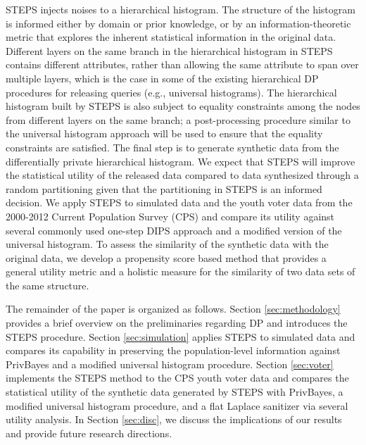 \documentclass[12pt, A4]{article}
\theoremstyle{plain}
\theoremstyle{exampstyle}\newtheorem{defn}{Definition}
\theoremstyle{exampstyle}\newtheorem{lem}{Lemma}
\theoremstyle{exampstyle}\newtheorem{cor}{Corollary}
\theoremstyle{exampstyle}\newtheorem{pro}{Proposition}
\theoremstyle{exampstyle}\newtheorem{cla}{Claim}
\theoremstyle{exampstyle}\newtheorem{rem}{Remark}
\begin{document}
STEPS injects noises to a hierarchical histogram. The structure of the histogram is informed either by domain or prior knowledge, or by an information-theoretic metric that explores the inherent statistical information in the original data. Different layers on the same branch in the hierarchical histogram in STEPS contains different attributes, rather than allowing the same attribute to span over multiple layers, which is the case in some of the existing hierarchical DP procedures for releasing queries (e.g., universal histograms). The hierarchical histogram built by STEPS is also subject to equality constraints among the nodes from different layers on the same branch; a post-processing procedure similar to the universal histogram approach \citep{hay2010boosting} will be used to ensure that the equality constraints are satisfied. The final step is to generate synthetic data from the differentially private hierarchical histogram. We expect that STEPS will improve the statistical utility of the released data compared to data synthesized through a random partitioning given that the partitioning in STEPS is an informed decision. We apply STEPS to simulated data and the youth voter data from the 2000-2012 Current Population Survey (CPS) and compare its utility against several commonly used one-step DIPS approach and a modified version of the universal histogram. To assess the similarity of the synthetic data with the original data, we develop a propensity score based method that provides a general utility metric and a holistic measure for the similarity of two data sets of the same structure. 

The remainder of the paper is organized as follows. Section \ref{sec:methodology} provides a brief overview on the preliminaries regarding DP and introduces the STEPS procedure. Section \ref{sec:simulation} applies STEPS to simulated data and compares its capability in preserving the population-level information against PrivBayes and a modified universal histogram procedure. Section \ref{sec:voter} implements the STEPS method to the CPS youth voter data and compares the statistical utility of the synthetic data generated by STEPS with PrivBayes, a modified universal histogram procedure, and a flat Laplace sanitizer via several utility analysis. In Section \ref{sec:disc}, we discuss the implications of our results and provide future research directions.

\end{document}
